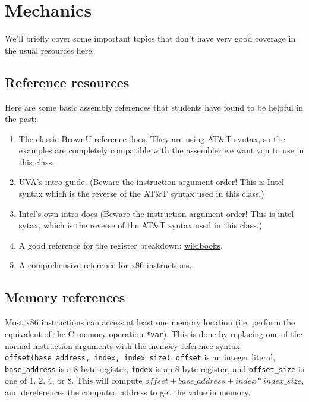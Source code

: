 \documentclass[11pt]{article}
\begin{document}
\section{Mechanics}

We'll briefly cover some important topics that don't have very good coverage in the usual
resources here.

\subsection{Reference resources}

Here are some basic assembly references that students have found to be helpful in the
past:

\begin{enumerate}
    \item The classic BrownU
        \href{https://cs.brown.edu/courses/cs033/docs/guides/x64_cheatsheet.pdf}{reference
        docs}. They are using AT\&T syntax, so the examples are completely compatible with
        the assembler we want you to use in this class.
    \item UVA's \href{https://www.cs.virginia.edu/~evans/cs216/guides/x86.html}{intro
        guide}. (Beware the instruction argument order! This is Intel syntax which
        is the reverse of the AT\&T syntax used in this class.)
    \item Intel's own
        \href{https://www.intel.com/content/dam/develop/external/us/en/documents/introduction-to-x64-assembly-181178.pdf}{intro docs}
        (Beware the instruction argument order! This is intel sytax, which is the reverse
        of the AT\&T syntax used in this class.)
    \item A good reference for the register breakdown:
        \href{https://en.wikibooks.org/wiki/X86_Assembly/X86_Architecture}{wikibooks}.
    \item A comprehensive reference for
        \href{https://www.felixcloutier.com/x86/}{x86 instructions}.
\end{enumerate}

\subsection{Memory references}

Most x86 instructions can access at least one memory location (i.e. perform the equivalent
of the C memory operation \texttt{*var}). This is done by replacing one of the normal
instruction arguments with the memory reference syntax \texttt{offset(base\_address,
index, index\_size)}. \texttt{offset} is an integer literal, \texttt{base\_address} is a
8-byte register, \texttt{index} is an 8-byte register, and \texttt{offset\_size} is one of
1, 2, 4, or 8. This will compute $offset + base\_address + index * index\_size$, and
dereferences the computed address to get the value in memory.
\end{document}
